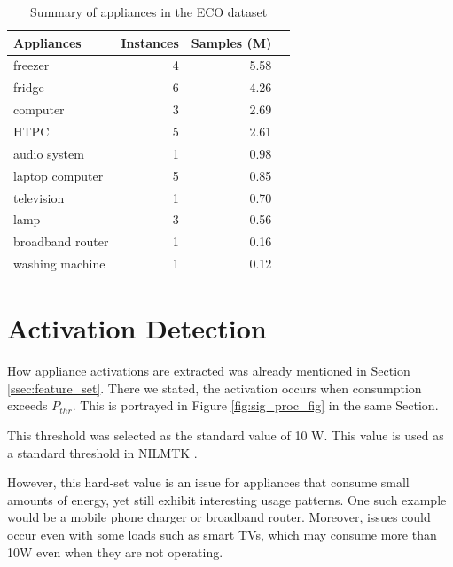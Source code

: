 \begin{table}[H]
    \centering
    \begin{tabular}{lrrr}
        \toprule
        \textbf{Appliances} & \textbf{Instances} & \textbf{Samples (M)}  \\
        \midrule
        freezer             & 4                   & 5.58                 \\
        fridge              & 6                   & 4.26                 \\
        computer            & 3                   & 2.69                 \\
        HTPC                & 5                   & 2.61                 \\
        audio system        & 1                   & 0.98                 \\
        laptop computer     & 5                   & 0.85                 \\
        television          & 1                   & 0.70                 \\
        lamp                & 3                   & 0.56                 \\
        broadband router    & 1                   & 0.16                 \\
        washing machine     & 1                   & 0.12                 \\
        \bottomrule
    \end{tabular}
    \caption{Summary of appliances in the ECO dataset}
    \label{tab:eco_table}
\end{table}


\section{Activation Detection}

How appliance activations are extracted was already mentioned in Section \ref{ssec:feature_set}.
There we stated, the activation occurs when consumption exceeds $P_{thr}$.
This is portrayed in Figure \ref{fig:sig_proc_fig} in the same Section.

This threshold was selected as the standard value of 10 W.
This value is used as a standard threshold in NILMTK \cite{nilmtk}.

However, this hard-set value is an issue for appliances that consume small amounts of energy,
yet still exhibit interesting usage patterns.
One such example would be a mobile phone charger or broadband router.
Moreover, issues could occur even with some loads such as smart TVs, which may consume more than 10W even when they are not operating.

